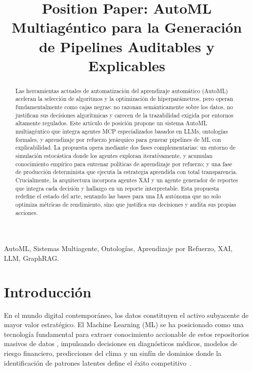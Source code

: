\documentclass[conference]{IEEEtran}
\title{Position Paper: AutoML Multiagéntico para la Generación de Pipelines Auditables y Explicables}
\author{
\IEEEauthorblockN{Jonnathan Cuzco, Joshua Cueva, Juan Coronel, Víctor Saquicela}
\IEEEauthorblockA{Universidad de Cuenca\\
\{jonathan.cuzcot, joshua.cueva, juan.coronelc, victor.saquicela\}@ucuenca.edu.ec}
}
\begin{document}
\maketitle

\begin{abstract}
Las herramientas actuales de automatización del aprendizaje automático (AutoML) aceleran la selección de algoritmos y la optimización de hiperparámetros, pero operan fundamentalmente como cajas negras: no razonan semánticamente sobre los datos, no justifican sus decisiones algorítmicas y carecen de la trazabilidad exigida por entornos altamente regulados. Este artículo de posición propone un sistema AutoML multiagéntico que integra agentes MCP especializados basados en LLMs, ontologías formales, y aprendizaje por refuerzo jerárquico para generar pipelines de ML con explicabilidad. La propuesta opera mediante dos fases complementarias: un entorno de simulación estocástica donde los agentes exploran iterativamente, y acumulan conocimiento empírico para entrenar políticas de aprendizaje por refuerzo; y una fase de producción determinista que ejecuta la estrategia aprendida con total transparencia. Crucialmente, la arquitectura incorpora agentes XAI y un agente generador de reportes que integra cada decisión y hallazgo en un reporte interpretable. Esta propuesta redefine el estado del arte, sentando las bases para una IA autónoma que no solo optimiza métricas de rendimiento, sino que justifica sus decisiones y audita sus propias acciones.
\end{abstract}

\begin{IEEEkeywords}
AutoML, Sistemas Multiagente, Ontologías, Aprendizaje por Refuerzo, XAI, LLM, GraphRAG.
\end{IEEEkeywords}

\section{Introducción}

En el mundo digital contemporáneo, los datos constituyen el activo subyacente de mayor valor estratégico. El Machine Learning (ML) se ha posicionado como una tecnología fundamental para extraer conocimiento accionable de estos repositorios masivos de datos \cite{he2021automl}, impulsando decisiones en diagnósticos médicos, modelos de riesgo financiero, predicciones del clima y un sinfín de dominios donde la identificación de patrones latentes define el éxito competitivo~\cite{baratchi2024}.
\end{document}
